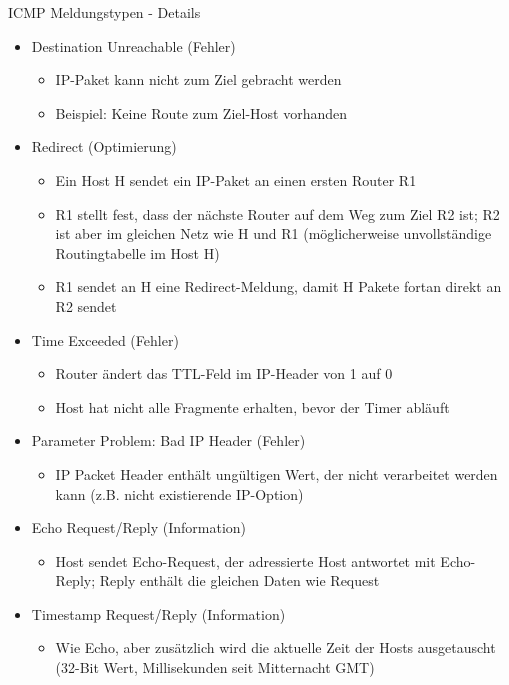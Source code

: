 \begin{definition}{ICMP Meldungstypen - Details}
    \begin{itemize}
        \item Destination Unreachable (Fehler)
        \begin{itemize}
            \item IP-Paket kann nicht zum Ziel gebracht werden
            \item Beispiel: Keine Route zum Ziel-Host vorhanden
        \end{itemize}
        \item Redirect (Optimierung)
        \begin{itemize}
            \item Ein Host H sendet ein IP-Paket an einen ersten Router R1
            \item R1 stellt fest, dass der nächste Router auf dem Weg zum Ziel R2 ist; R2 ist aber im gleichen Netz wie H und R1 (möglicherweise unvollständige Routingtabelle im Host H)
            \item R1 sendet an H eine Redirect-Meldung, damit H Pakete fortan direkt an R2 sendet
        \end{itemize}
        \item Time Exceeded (Fehler)
        \begin{itemize}
            \item Router ändert das TTL-Feld im IP-Header von 1 auf 0
            \item Host hat nicht alle Fragmente erhalten, bevor der Timer abläuft
        \end{itemize}
        \item Parameter Problem: Bad IP Header (Fehler)
        \begin{itemize}
            \item IP Packet Header enthält ungültigen Wert, der nicht verarbeitet werden kann (z.B. nicht existierende IP-Option)
        \end{itemize}
        \item Echo Request/Reply (Information)
        \begin{itemize}
            \item Host sendet Echo-Request, der adressierte Host antwortet mit Echo-Reply; Reply enthält die gleichen Daten wie Request
        \end{itemize}
        \item Timestamp Request/Reply (Information)
        \begin{itemize}
            \item Wie Echo, aber zusätzlich wird die aktuelle Zeit der Hosts ausgetauscht (32-Bit Wert, Millisekunden seit Mitternacht GMT)
        \end{itemize}
    \end{itemize}
\end{definition}

